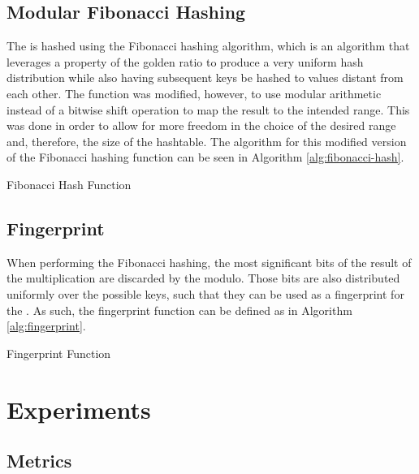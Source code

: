 \subsection{Modular Fibonacci Hashing}

The \kmer is hashed using the Fibonacci hashing algorithm, which is an algorithm that leverages a property of the golden ratio
to produce a very uniform hash distribution while also having subsequent keys be hashed to values distant from each other. The
function was modified, however, to use modular arithmetic instead of a bitwise shift operation to map the result to the intended
range. This was done in order to allow for more freedom in the choice of the desired range and, therefore, the size of the
hashtable. The algorithm for this modified version of the Fibonacci hashing function can be seen in Algorithm \ref{alg:fibonacci-hash}.

\begin{algorithm}
  \caption{Fibonacci Hash Function}\label{alg:fibonacci-hash}
\end{algorithm}

\subsection{Fingerprint}

When performing the Fibonacci hashing, the most significant bits of the result of the multiplication are discarded by the modulo.
Those bits are also distributed uniformly over the possible keys, such that they can be used as a fingerprint for the \kmer.
As such, the fingerprint function can be defined as in Algorithm \ref{alg:fingerprint}. 

\begin{algorithm}
  \caption{Fingerprint Function}\label{alg:fingerprint}
\end{algorithm}

\section{Experiments}

\subsection{Metrics}

